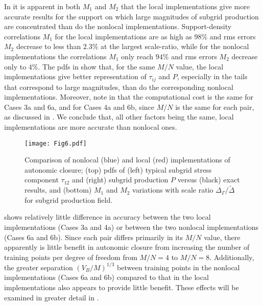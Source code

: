 In  it is apparent in both $M_1$  and $M_2$  that the local implementations give more accurate results for the support on which large magnitudes of subgrid production are concentrated than do the nonlocal implementations. Support-density correlations $M_1$ for the local implementations are as high as $98\%$ and rms errors $M_2$  decrease to less than $2.3\%$  at the largest scale-ratio, while for the nonlocal implementations the correlations $M_1$  only reach $94\%$ and rms errors $M_2$  decrease only to $4\%$. The pdfs in   show that, for the same $M/N$  value, the local implementations give better representation of  $\tau_{ij}$ and $P$, especially in the tails that correspond to large magnitudes, than do the corresponding nonlocal implementations. Moreover, note in  that the computational cost is the same for Cases 3a and 6a, and for Cases 4a and 6b, since  $M/N$ is the same for each pair, as discussed in . We conclude that, all other factors being the same, local implementations are more accurate than nonlocal ones. 

%
\begin{figure}
	\centering \hspace{-1.0cm}
	\texttt{[image: Fig6.pdf]}
	\caption{ Comparison of nonlocal (blue) and local (red) implementations of autonomic closure; (top) pdfs of (left) typical subgrid stress component $\tau_{12}$ and (right) subgrid production $P$ versus (black) exact results, and (bottom) $M_1$ and $M_2$ variations with scale ratio $\Delta_{\Gamma}/\widetilde{\Delta}$ for subgrid production field. }
	\label{F:6}
\end{figure}
%
%

\clearpage
{} shows relatively little difference in accuracy between the two local implementations (Cases 3a and 4a) or between the two nonlocal implementations (Cases 6a and 6b). Since each pair differs primarily in its  $M/N$ value, there apparently is little benefit in autonomic closure from increasing the number of training points per degree of freedom from  $M/N = 4$ to  $M/N = 8$. Additionally, the greater separation  $(V_B/M)^{1/3}$ between training points in the nonlocal implementations (Cases 6a and 6b) compared to that in the local implementations also appears to provide little benefit. These effects will be examined in greater detail in .





